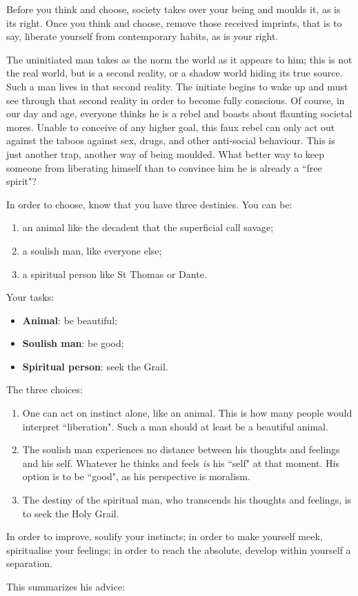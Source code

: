 \begin{quotex}
Before you think and choose, society takes over your being and moulds it, as is its right. Once you think and choose, remove those received imprints, that is to say, liberate yourself from contemporary habits, as is your right. 

\end{quotex}
The uninitiated man takes as the norm the world as it appears to him; this is not the real world, but is a second reality, or a shadow world hiding its true source. Such a man lives in that second reality. The initiate begins to wake up and must see through that second reality in order to become fully conscious. Of course, in our day and age, everyone thinks he is a rebel and boasts about flaunting societal mores. Unable to conceive of any higher goal, this faux rebel can only act out against the taboos against sex, drugs, and other anti-social behaviour. This is just another trap, another way of being moulded. What better way to keep someone from liberating himself than to convince him he is already a ``free spirit"?

\begin{quotex}
In order to choose, know that you have three destinies. You can be:

\begin{enumerate}
\item an animal like the decadent that the superficial call savage; 
\item a soulish man, like everyone else; 
\item a spiritual person like St Thomas or Dante. 
\end{enumerate}

Your tasks:

\begin{itemize}
\item \textbf{Animal}: be beautiful; 
\item \textbf{Soulish man}: be good; 
\item \textbf{Spiritual person}: seek the Grail. 
\end{itemize}
\end{quotex}
The three choices:

\begin{enumerate}
\item One can act on instinct alone, like an animal. This is how many people would interpret ``liberation". Such a man should at least be a beautiful animal. 
\item The soulish man experiences no distance between his thoughts and feelings and his self. Whatever he thinks and feels \emph{is} his ``self" at that moment. His option is to be ``good", as his perspective is moralism. 
\item The destiny of the spiritual man, who transcends his thoughts and feelings, is to seek the Holy Grail. 
\end{enumerate}
\begin{quotex}
In order to improve, soulify your instincts; in order to make yourself meek, spiritualise your feelings; in order to reach the absolute, develop within yourself a separation. 

\end{quotex}
This summarizes his advice:

